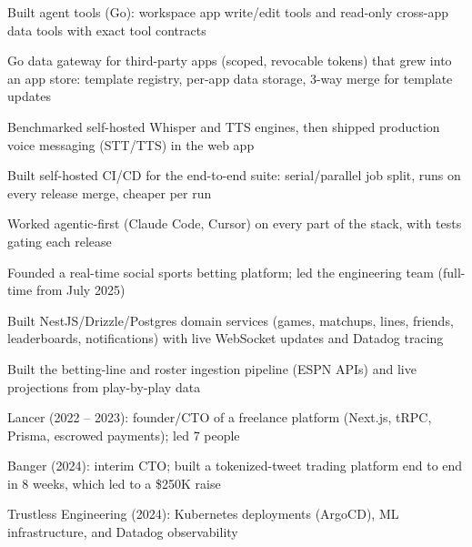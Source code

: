 \documentclass[print]{jack-resume}
\begin{document}
\begin{tightemize}
    \item Built agent tools (Go): workspace app write/edit tools and read-only cross-app data tools with exact tool contracts
    \item Go data gateway for third-party apps (scoped, revocable tokens) that grew into an app store: template registry, per-app data storage, 3-way merge for template updates
    \item Benchmarked self-hosted Whisper and TTS engines, then shipped production voice messaging (STT/TTS) in the web app
    \item Built self-hosted CI/CD for the end-to-end suite: serial/parallel job split, runs on every release merge, cheaper per run
    \item Worked agentic-first (Claude Code, Cursor) on every part of the stack, with tests gating each release
\end{tightemize}
\sectionsep

\begin{tightemize}
    \item Founded a real-time social sports betting platform; led the engineering team (full-time from July 2025)
    \item Built NestJS/Drizzle/Postgres domain services (games, matchups, lines, friends, leaderboards, notifications) with live WebSocket updates and Datadog tracing
    \item Built the betting-line and roster ingestion pipeline (ESPN APIs) and live projections from play-by-play data
\end{tightemize}
\sectionsep

\begin{tightemize}
    \item Lancer (2022 -- 2023): founder/CTO of a freelance platform (Next.js, tRPC, Prisma, escrowed payments); led 7 people
    \item Banger (2024): interim CTO; built a tokenized-tweet trading platform end to end in 8 weeks, which led to a \$250K raise
    \item Trustless Engineering (2024): Kubernetes deployments (ArgoCD), ML infrastructure, and Datadog observability
\end{tightemize}
\sectionsep
\end{document}
